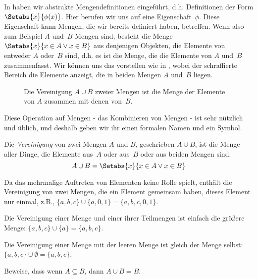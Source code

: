 \documentclass[../../../include/open-logic-section]{subfiles}
\begin{document}

\begin{explain}
In  haben wir abstrakte Mengendefinitionen eingeführt,
 d.h. Definitionen der Form $\Setabs{x}{\phi(x)}$.
Hier berufen wir uns auf eine Eigenschaft~$\phi$. Diese Eigenschaft kann
Mengen, die wir bereits definiert haben, betreffen. Wenn also zum Beispiel $A$ und~$B$ Mengen sind,
besteht die Menge $\Setabs{x}{x \in A \lor x \in B}$ aus denjenigen
Objekten, die Elemente von entweder $A$ oder~$B$ sind, d.h. es ist die
Menge, die die Elemente von $A$ und~$B$ zusammenfasst. Wir können uns das vorstellen
wie in , wobei der schraffierte Bereich die
Elemente anzeigt, die in beiden Mengen $A$ und~$B$ liegen.

\begin{figure}
  \caption{Die Vereinigung $A \cup B$ zweier Mengen ist die Menge der Elemente von
   $A$ zusammen mit denen von~$B$.}
\end{figure}

Diese Operation auf Mengen - das Kombinieren von Mengen - ist sehr nützlich und üblich,
und deshalb geben wir ihr einen formalen Namen und ein Symbol. 
\end{explain}

\begin{defn}[Vereinigung]
Die \emph{Vereinigung} von zwei Mengen $A$ und $B$, geschrieben $A \cup B$, ist die
Menge aller Dinge, die Elemente aus~$A$ oder aus~$B$ oder aus beiden Mengen sind.
\[
A \cup B = \Setabs{x}{x \in A \lor x \in B}
\]
\end{defn}

\begin{ex}
Da das mehrmalige Auftreten von Elementen keine Rolle spielt, enthält die Vereinigung von zwei
Mengen, die ein Element gemeinsam haben, dieses Element nur einmal,
z.B., $\{ a, b, c\} \cup \{ a, 0, 1\} = \{a, b, c, 0, 1\}$.

Die Vereinigung einer Menge und einer ihrer Teilmengen ist einfach die größere Menge: $\{a,
b, c \} \cup \{a \} = \{a, b, c\}$.

Die Vereinigung einer Menge mit der leeren Menge ist gleich der Menge selbst: $\{a,
b, c \} \cup \emptyset = \{a, b, c \}$.
\end{ex}

\begin{prob}
Beweise, dass wenn $A \subseteq B$, dann $A \cup B = B$.
\end{prob}
\end{document}

